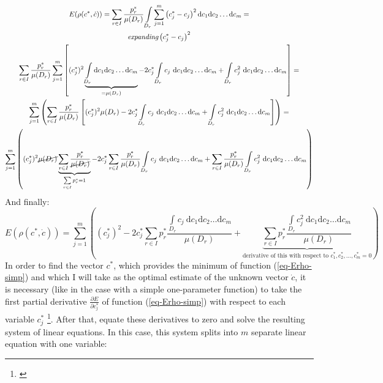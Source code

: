 \begin{gather}
\nonumber
E(\rho(c^{*},\dot{c}))=\sum\limits_{r \in I} \frac{p_{r}^{*}}{\mu(D_{r})} \int\limits_{D_{r}}\sum\limits_{j=1}^{m} \left( c_{j}^{*}-c_{j} \right)^{2}\mathrm{d}c_{1}\mathrm{d}c_{2}\dots \mathrm{d}c_{m} = \\
\nonumber
\textit{expanding} \left( c_{j}^{*}-c_{j} \right)^{2} \\
\nonumber
\sum\limits_{r \in I} \frac{p_{r}^{*}}{\mu(D_{r})} \sum\limits_{j=1}^{m} \left[ (c_{j}^{*})^{2} \underbrace{\int\limits_{D_{r}} \mathrm{d}c_{1}\mathrm{d}c_{2}\dots \mathrm{d}c_{m}}_{{=\mu(D_{r})}} - 2c_{j}^{*} \int\limits_{D_{r}} c_{j} \  \mathrm{d}c_{1}\mathrm{d}c_{2}\dots \mathrm{d}c_{m} + \int\limits_{D_{r}} c_{j}^{2} \  \mathrm{d}c_{1}\mathrm{d}c_{2}\dots \mathrm{d}c_{m}\right]= \\
\nonumber
\sum\limits_{j=1}^{m} \left( \sum\limits_{r \in I} \frac{p_{r}^{*}}{\mu(D_{r})} \left[ (c_{j}^{*})^{2} \mu(D_{r})-2c_{j}^{*} \int\limits_{D_{r}} c_{j} \  \mathrm{d}c_{1}\mathrm{d}c_{2}\dots \mathrm{d}c_{m} + \int\limits_{D_{r}} c_{j}^{2} \  \mathrm{d}c_{1}\mathrm{d}c_{2}\dots \mathrm{d}c_{m} \right] \right) = \\ 
\sum\limits_{j=1}^{m} \left( (c_{j}^{*})^{2} \cancel{\mu(D_{r})} \underbrace{\sum\limits_{r \in I} \frac{p_{r}^{*}}{\cancel{\mu(D_{r})}}}_{\sum\limits_{r \in I}p_{r}^{*} = 1} - 2c_{j}^{*} \sum\limits_{r \in I}\frac{p_{r}^{*}}{\mu(D_{r})} \int\limits_{D_{r}} c_{j} \  \mathrm{d}c_{1}\mathrm{d}c_{2}\dots \mathrm{d}c_{m} + \sum\limits_{r \in I}\frac{p_{r}^{*}}{\mu(D_{r})} \int\limits_{D_{r}} c_{j}^{2} \  \mathrm{d}c_{1}\mathrm{d}c_{2}\dots \mathrm{d}c_{m} \right)
\end{gather}
And finally:
\begin{equation}
E(\rho(c^{*},\dot{c}))= \sum\limits_{j=1}^{m} \left( (c_{j}^{*})^{2} - 2c_{j}^{*} \sum\limits_{r \in I} p_{r}^{*} \frac{\int\limits_{D_{r}} c_{j} \  \mathrm{d}c_{1}\mathrm{d}c_{2}\dots \mathrm{d}c_{m}}{\mu(D_{r})} + \underbrace{\sum\limits_{r \in I} p_{r}^{*} \frac{\int\limits_{D_{r}} c_{j}^{2} \  \mathrm{d}c_{1}\mathrm{d}c_{2}\dots \mathrm{d}c_{m}}{\mu(D_{r})}}_{\text{derivative of this with respect to } c_{1}^{*}, c_{2}^{*},\dots,c_{m}^{*} = 0} \right) \label{eq-Erho-simp}
\end{equation}
In order to find the vector $c^{*}$, which provides the minimum of function (\ref{eq-Erho-simp}) and which I will take as the optimal estimate of the unknown vector $\dot{c}$, it is necessary (like in the case with a simple one-parameter function) to take the first partial derivative $\frac{\partial E}{\partial c_{j}^{*}}$ of function (\ref{eq-Erho-simp}) with respect to each variable $c_{j}^{*}$ \footnote{\cite{stewart_2008_deriv}}. After that, equate these derivatives to zero and solve the resulting system of linear equations. In this case, this system splits into $m$ separate linear equation with one variable:
